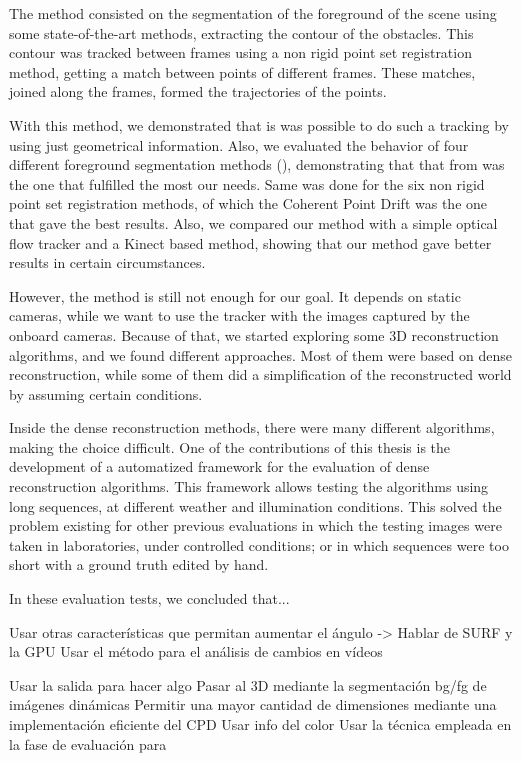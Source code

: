 The method consisted on the segmentation of the foreground of the scene using some state-of-the-art methods, extracting the contour of the obstacles. This contour was tracked between frames using a non rigid point set registration method, getting a match between points of different frames. These matches, joined along the frames, formed the trajectories of the points.

With this method, we demonstrated that is was possible to do such a tracking by using just geometrical information. Also, we evaluated the behavior of four different foreground segmentation methods (\cite{lopez2011stochastic, lopez2011foreground, guo2011hierarchical, reddy2012improved}), demonstrating that that from \cite{reddy2012improved} was the one that fulfilled the most our needs. Same was done for the six non rigid point set registration methods, of which the Coherent Point Drift was the one that gave the best results. Also, we compared our method with a simple optical flow tracker and a Kinect based method, showing that our method gave better results in certain circumstances.

However, the method is still not enough for our goal. It depends on static cameras, while we want to use the tracker with the images captured by the onboard cameras. Because of that, we started exploring some 3D reconstruction algorithms, and we found different approaches. Most of them were based on dense reconstruction, while some of them did a simplification of the reconstructed world by assuming certain conditions.

Inside the dense reconstruction methods, there were many different algorithms, making the choice difficult. One of the contributions of this thesis is the development of a automatized framework for the evaluation of dense reconstruction algorithms. This framework allows testing the algorithms using long sequences, at different weather and illumination conditions. This solved the problem existing for other previous evaluations in which the testing images were taken in laboratories, under controlled conditions; or in which sequences were too short with a ground truth edited by hand.

In these evaluation tests, we concluded that...



Usar otras características que permitan aumentar el ángulo -> Hablar de SURF y la GPU
Usar el método para el análisis de cambios en vídeos

Usar la salida para hacer algo
Pasar al 3D mediante la segmentación bg/fg de imágenes dinámicas
Permitir una mayor cantidad de dimensiones mediante una implementación eficiente del CPD
Usar info del color
Usar la técnica empleada en la fase de evaluación para 
